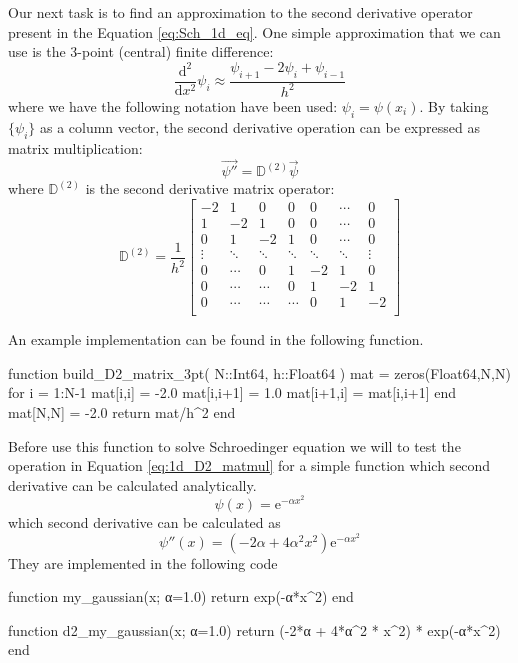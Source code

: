 Our next task is to find an approximation to the second derivative operator
present in the Equation \eqref{eq:Sch_1d_eq}.
One simple approximation that we can use is the 3-point (central) finite difference:
\begin{equation}
\frac{\mathrm{d}^2}{\mathrm{d}x^2} \psi_{i} \approx
\frac{\psi_{i+1} - 2\psi_{i} + \psi_{i-1}}{h^2}
\end{equation}
where we have the following notation have been used: $\psi_{i} = \psi(x_{i})$.
%
By taking $\{ \psi_{i} \}$ as a column vector, the second derivative operation
can be expressed as matrix multiplication:
\begin{equation}
\vec{\psi''} = \mathbb{D}^{(2)} \vec{\psi}
\end{equation}
where $\mathbb{D}^{(2)}$ is the second derivative matrix operator:
\begin{equation}
\mathbb{D}^{(2)} = \frac{1}{h^2}
\begin{bmatrix}
-2  &  1  &  0  &  0  & 0 & \cdots & 0 \\
 1  & -2  &  1  &  0  & 0 & \cdots & 0 \\
 0  &  1  & -2  &  1  & 0 & \cdots & 0 \\
 \vdots  &  \ddots  &  \ddots  & \ddots  & \ddots  & \ddots & \vdots \\
 0 & \cdots & 0 & 1 & -2 & 1 & 0 \\
 0  &  \cdots  & \cdots & 0  & 1  & -2  & 1 \\
 0  &  \cdots  & \cdots & \cdots & 0  &  1  & -2 \\
\end{bmatrix}
\label{eq:1d_D2_matmul}
\end{equation}

An example implementation can be found in the following function.
\begin{juliacode}
function build_D2_matrix_3pt( N::Int64, h::Float64 )
    mat = zeros(Float64,N,N)
    for i = 1:N-1
        mat[i,i] = -2.0
        mat[i,i+1] = 1.0
        mat[i+1,i] = mat[i,i+1]
    end
    mat[N,N] = -2.0
    return mat/h^2
end
\end{juliacode}


Before use this function to solve Schroedinger equation we will to test the operation
in Equation \eqref{eq:1d_D2_matmul} for a simple function which second derivative
can be calculated analytically.
\begin{equation}
\psi(x) = \mathrm{e}^{-\alpha x^2}
\end{equation}
%
which second derivative can be calculated as
%
\begin{equation}
\psi''(x) = \left( -2 \alpha + 4\alpha^2 x^2 \right) \mathrm{e}^{-\alpha x^2}
\end{equation}
%
They are implemented in the following code
\begin{juliacode}
function my_gaussian(x; α=1.0)
    return exp(-α*x^2)
end

function d2_my_gaussian(x; α=1.0)
    return (-2*α + 4*α^2 * x^2) * exp(-α*x^2)
end
\end{juliacode}

